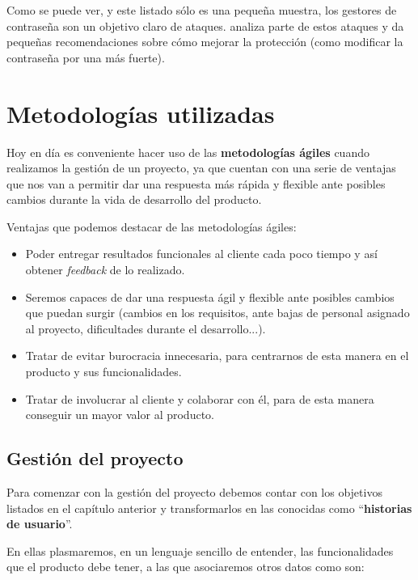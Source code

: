 \documentclass{\ClassPath/viu-tfm-template}
\begin{document}
Como se puede ver, y este listado sólo es una pequeña muestra, los gestores de contraseña son un objetivo claro de ataques.  \textcite{hacked3} analiza parte de estos ataques y da pequeñas recomendaciones sobre cómo mejorar la protección (como modificar la contraseña por una más fuerte).

\chapter{Metodologías utilizadas}

Hoy en día es conveniente hacer uso de las \textbf{metodologías ágiles} cuando realizamos la gestión de un proyecto, ya que cuentan con una serie de ventajas que nos van a permitir dar una respuesta más rápida y flexible ante posibles cambios durante la vida de desarrollo del producto.

Ventajas que podemos destacar de las metodologías ágiles:

\begin{itemize}
    \item Poder entregar resultados funcionales al cliente cada poco tiempo y así obtener \textit{feedback} de lo realizado.
    \item Seremos capaces de dar una respuesta ágil y flexible ante posibles cambios que puedan surgir (cambios en los requisitos, ante bajas de personal asignado al proyecto, dificultades durante el desarrollo...).
    \item Tratar de evitar burocracia innecesaria, para centrarnos de esta manera en el producto y sus funcionalidades.
    \item Tratar de involucrar al cliente y colaborar con él, para de esta manera conseguir un mayor valor al producto.
\end{itemize}

\section{Gestión del proyecto}

Para comenzar con la gestión del proyecto debemos contar con los objetivos listados en el capítulo anterior y transformarlos en las conocidas como “\textbf{historias de usuario}”.

En ellas plasmaremos, en un lenguaje sencillo de entender, las funcionalidades que el producto debe tener, a las que asociaremos otros datos como son:
\end{document}
